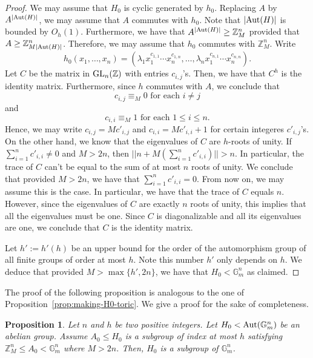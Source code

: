 \documentclass{amsart}
\newcommand{\zz}{\mathbb{Z}}
\newtheorem{proposition}[theorem]{Proposition}
\theoremstyle{remark}
\numberwithin{equation}{section}
\begin{document}
\begin{proof}
We may assume that $H_0$ is cyclic generated by $h_0$.
Replacing $A$ by $A^{|{\rm Aut}(H)|}$, we may assume that
$A$ commutes with $h_0$.
Note that $|{\rm Aut}(H)|$ is bounded by $O_h(1)$.
Furthermore, we have that $A^{|{\rm Aut}(H)|} \geq \zz_M^n$ provided that
$A\geq \zz_{M|{\rm Aut}(H)|}^n$.
Therefore, we may assume that $h_0$ commutes with $\zz^n_M$.
Write
\[
h_0(x_1,\dots,x_n)=
(\lambda_1 x_1^{c_{1,1}}\cdots x_n^{c_{1,n}}, \dots ,
\lambda_n 
x_1^{c_{n,1}}\cdots x_n^{c_{n,n}}).
\]
Let $C$ be the matrix in ${\rm GL}_n(\zz)$ with entries $c_{i,j}$'s.
Then, we have that $C^h$
is the identity matrix.
Furthermore, since $h$ commutes with $A$, we conclude that
\[
c_{i,j}\equiv_M 0 \text{ for each $i\neq j$}
\]
and 
\[
c_{i,i}\equiv_M 1 \text{ for each $1\leq i\leq n$.}
\]
Hence, we may write 
$c_{i,j}=Mc'_{i,j}$
and $c_{i,i}=Mc'_{i,i}+1$
for certain integeres $c'_{i,j}$'s.
On the other hand, we know that the eigenvalues of $C$ are $h$-roots of unity.
If $\sum_{i=1}^n c'_{i,i}\neq 0$
and $M>2n$, 
then $||n+M(\sum_{i=1}^n c'_{i,i})||>n$.
In particular, the trace of $C$ can't be equal 
to the sum of at most $n$ roots of unity.
We conclude that
provided $M>2n$,
we have that $\sum_{i=1}^n c'_{i,i}=0$.
From now on, we may assume this is the case.
In particular, we have that the trace of $C$ equals $n$.
However, since the eigenvalues of $C$ are exactly $n$
roots of unity,
this implies that all the eigenvalues must be one.
Since $C$ is diagonalizable and all its eigenvalues are one,
we conclude that $C$ is the identity matrix.

Let $h':=h'(h)$ be an upper bound for the order
of the automorphism group of all finite groups of order at most $h$.
Note this number $h'$ only depends on $h$.
We deduce that
provided $M>\max\{h',2n\}$,
we have that $H_0<\mathbb{G}_m^n$ as claimed.
\end{proof}

The proof of the following proposition is analogous to the one of Proposition~\ref{prop:making-H0-toric}.
We give a proof for the sake of completeness.

\begin{proposition}\label{prop:making-abelian-group-toric}
Let $n$ and $h$ be two positive integers.
Let $H_0<{\rm Aut}(\mathbb{G}_m^n)$ be an abelian group.
Assume $A_0\leqslant H_0$ is a subgroup of index at most $h$ 
satisfying
$\zz_M^n\leqslant  A_0<\mathbb{G}_m^n$
where $M>2n$.
Then, $H_0$ is a subgroup of $\mathbb{G}_m^n$.
\end{proposition}
\end{document}
